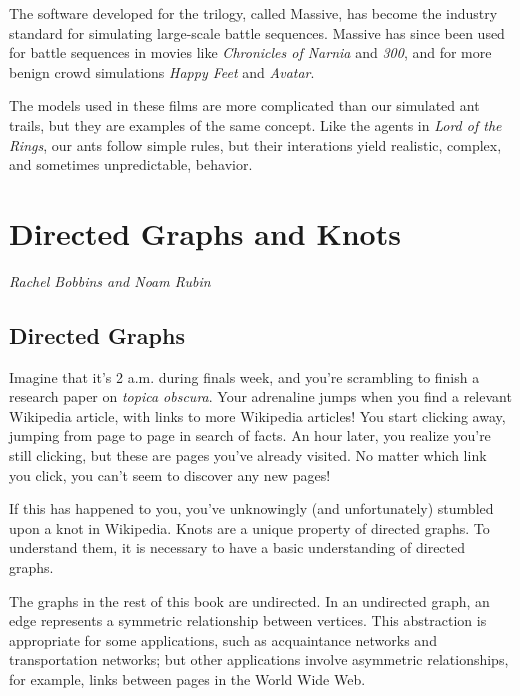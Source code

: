 \documentclass[10pt]{book}
\begin{document}

The software developed for the trilogy, called Massive, has become the
industry standard for simulating large-scale battle sequences.
Massive has since been used for battle sequences in
movies like \emph{Chronicles of Narnia} and \emph{300}, and for
more benign crowd simulations \emph{Happy Feet} and
\emph{Avatar}.

The models used in these films are more complicated than our simulated
ant trails, but they are examples of the same concept.  Like the
agents in \emph{Lord of the Rings}, our ants follow simple rules, but
their interations yield realistic, complex, and sometimes
unpredictable, behavior.


\chapter{Directed Graphs and Knots}

{\em Rachel Bobbins and Noam Rubin}

\section{Directed Graphs}

Imagine that it's 2 a.m. during finals week, and you're scrambling to
finish a research paper on \emph{topica obscura}. Your adrenaline
jumps when you find a relevant Wikipedia article, with links
to more Wikipedia articles! You start clicking away, jumping from page
to page in search of facts. An hour later, you realize you're still
clicking, but these are pages you've already visited. No matter which
link you click, you can't seem to discover any new pages!

If this has happened to you, you've unknowingly
(and unfortunately) stumbled upon a knot in Wikipedia. Knots are a
unique property of directed graphs. To understand them, it is necessary
to have a basic understanding of directed graphs.
	 	 	
The graphs in the rest of this book are undirected. In an
undirected graph, an edge represents a symmetric relationship between
vertices. This abstraction is appropriate for some applications,
such as acquaintance networks and transportation networks; but other
applications involve asymmetric relationships, for example, links
between pages in the World Wide Web.
\end{document}
